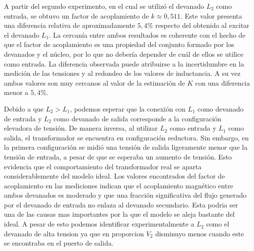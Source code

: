 A partir del segundo experimento, en el cual se utilizó el devanado $L_2$ como entrada, se obtuvo un factor de acoplamiento de $k\approx0,511$. Este valor presenta una diferencia relativa de aproximadamente $5,4\%$ respecto del obtenido al excitar el devanado $L_1$. La cercanía entre ambos resultados es coherente con el hecho de que el factor de acoplamiento es una propiedad del conjunto formado por los devanados y el núcleo, por lo que no debería depender de cuál de ellos se utilice como entrada. La diferencia observada puede atribuirse a la incertidumbre en la medición de las tensiones y al redondeo de los valores de inductancia. A su vez ambos valores son muy cercanos al valor de la estimación de $K$ con una diferencia menor a $5,4\%$. 

Debido a que $L_2>L_1$, podemos esperar que la conexión con $L_1$ como devanado de entrada y $L_2$ como devanado de salida corresponde a la configuración elevadora de tensión. De manera inversa, al utilizar $L_2$ como entrada y $L_1$ como salida, el transformador se encuentra en configuración reductora. Sin embargo, en la primera configuración se midió una tensión de salida ligeramente menor que la tensión de entrada, a pesar de que se esperaba un aumento de tensión. Esto evidencia que el comportamiento del transformador real se aparta considerablemente del modelo ideal.  Los valores encontrados del factor de acoplamiento en las mediciones indican que el acoplamiento magnético entre ambos devanados es moderado y que una fracción significativa del flujo generado por el devanado de entrada no enlaza al devanado secundario. Esta podria ser una de las causas mas importantes por la que el modelo se aleja bastante del ideal. A pesar de esto podemos identificar experimentalmente a $L_2$ como el devanado de alta tension ya que en proporcion $V_2$ disminuyo menos cuando este se encontraba en el puerto de salida. 

